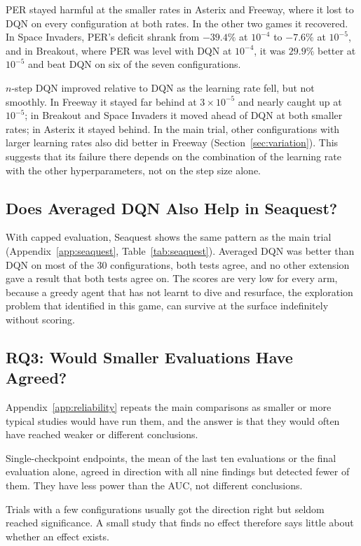 \documentclass[conference,a4paper]{IEEEtran}
\begin{document}
PER stayed harmful at the smaller rates in Asterix and Freeway, where it lost to DQN on every configuration at both
rates. In the other two games it recovered. In Space Invaders, PER's deficit shrank from $-39.4\%$ at $10^{-4}$ to $-7.6\%$ at $10^{-5}$, and in
Breakout, where PER was level with DQN at $10^{-4}$, it was $29.9\%$ better at $10^{-5}$ and beat DQN on six of the
seven configurations.

$n$-step DQN improved relative to DQN as the learning rate fell, but not smoothly. In Freeway it stayed far behind at
$3\times10^{-5}$ and nearly caught up at $10^{-5}$; in Breakout and Space Invaders it moved ahead of DQN at both smaller
rates; in Asterix it stayed behind. In the main trial, other configurations with larger learning rates also did
better in Freeway (Section~\ref{sec:variation}). This suggests that its failure there depends on the combination of
the learning rate with the other hyperparameters, not on the step size alone.

\subsection{Does Averaged DQN Also Help in Seaquest?}\label{sec:seaquest}
With capped evaluation, Seaquest shows the same pattern as the main trial (Appendix~\ref{app:seaquest},
Table~\ref{tab:seaquest}). Averaged DQN was better than DQN on most of the 30 configurations, both tests agree, and no
other extension gave a result that both tests agree on. The scores are very low for every arm, because a greedy agent
that has not learnt to dive and resurface, the exploration problem that \citet{young2019minatar} identified in this
game, can survive at the surface indefinitely without scoring.

\subsection{RQ3: Would Smaller Evaluations Have Agreed?}\label{sec:reliability}
Appendix~\ref{app:reliability} repeats the main comparisons as smaller or more typical studies would have run them, and
the answer is that they would often have reached weaker or different conclusions.

Single-checkpoint endpoints, the mean of the last ten evaluations or the final evaluation alone, agreed in direction
with all nine findings but detected fewer of them. They have less power than the AUC, not different conclusions.

Trials with a few configurations usually got the direction right but seldom reached significance. A small study that
finds no effect therefore says little about whether an effect exists.
\end{document}
